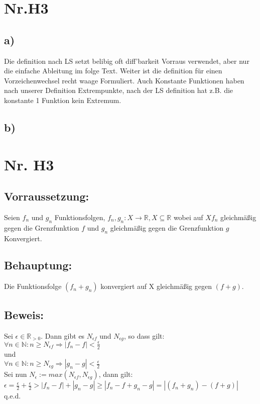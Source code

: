 \section*{Nr.H3}

\subsection*{a)}

Die definition nach LS setzt belibig oft diff'barkeit Vorraus verwendet,
aber nur die einfache Ableitung im folge Text.
Weiter ist die definition für einen Vorzeichenwechsel recht waage Formuliert.
Auch Konstante Funktionen haben nach unserer Definition Extrempunkte, nach der LS definition
hat z.B. die konstante 1 Funktion kein Extremum.


\subsection*{b)}

\section*{Nr. H3}
\subsection*{Vorraussetzung:} Seien $f_{n}$ und $g_{n}$ Funktionsfolgen, $f_{n}, g_{n} : X \rightarrow \mathbb{R}, X \subseteq \mathbb{R}$ wobei auf $X f_{n}$ gleichmäßig gegen die Grenzfunktion $f$ und $g_{n}$ gleichmäßig gegen die Grenzfunktion $g$ Konvergiert.

\subsection*{Behauptung:} Die Funktionsfolge $(f_{n}+g_{n})$ konvergiert auf X gleichmäßig gegen $(f+g)$.

\subsection*{Beweis:} Sei $\epsilon \in \mathbb{R}_{>0}$. Dann gibt es $N_{\epsilon f}$ und $N_{\epsilon g}$, so dass gilt: \\
$\forall n \in \mathbb{N} : n \geq N_{\epsilon f} \Rightarrow |f_{n}-f| < \frac{\epsilon} {2}$\\
und \\
$\forall n \in \mathbb{N} : n \geq N_{\epsilon g} \Rightarrow |g_{n}-g| < \frac{\epsilon} {2}$ \\
Sei nun  $N_{\epsilon} := max(N_{\epsilon f}, N_{\epsilon g})$, dann gilt: \\
$\epsilon = \frac{\epsilon} {2}+\frac{\epsilon} {2} > |f_{n}-f|+|g_{n}-g| \geq |f_{n}-f+g_{n}-g| = |(f_{n}+g_{n})-(f+g)|$\\
q.e.d.